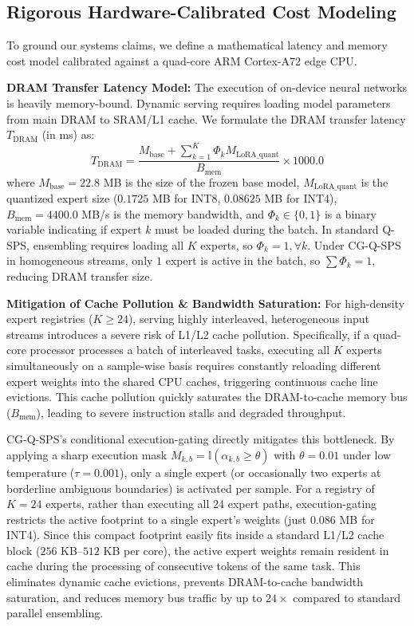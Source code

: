 \subsection{Rigorous Hardware-Calibrated Cost Modeling}
To ground our systems claims, we define a mathematical latency and memory cost model calibrated against a quad-core ARM Cortex-A72 edge CPU.

\textbf{DRAM Transfer Latency Model:} The execution of on-device neural networks is heavily memory-bound. Dynamic serving requires loading model parameters from main DRAM to SRAM/L1 cache. We formulate the DRAM transfer latency $T_{\text{DRAM}}$ (in ms) as:
\begin{equation}
  T_{\text{DRAM}} = \frac{M_{\text{base}} + \sum_{k=1}^K \Phi_k M_{\text{LoRA\_quant}}}{B_{\text{mem}}} \times 1000.0
\end{equation}
where $M_{\text{base}} = 22.8$ MB is the size of the frozen base model, $M_{\text{LoRA\_quant}}$ is the quantized expert size ($0.1725$ MB for INT8, $0.08625$ MB for INT4), $B_{\text{mem}} = 4400.0$ MB/s is the memory bandwidth, and $\Phi_k \in \{0, 1\}$ is a binary variable indicating if expert $k$ must be loaded during the batch.
In standard Q-SPS, ensembling requires loading all $K$ experts, so $\Phi_k = 1, \forall k$. Under CG-Q-SPS in homogeneous streams, only $1$ expert is active in the batch, so $\sum \Phi_k = 1$, reducing DRAM transfer size.

\textbf{Mitigation of Cache Pollution \& Bandwidth Saturation:} For high-density expert registries ($K \ge 24$), serving highly interleaved, heterogeneous input streams introduces a severe risk of L1/L2 cache pollution. Specifically, if a quad-core processor processes a batch of interleaved tasks, executing all $K$ experts simultaneously on a sample-wise basis requires constantly reloading different expert weights into the shared CPU caches, triggering continuous cache line evictions. This cache pollution quickly saturates the DRAM-to-cache memory bus ($B_{\text{mem}}$), leading to severe instruction stalls and degraded throughput. 

CG-Q-SPS's conditional execution-gating directly mitigates this bottleneck. By applying a sharp execution mask $M_{k, b} = \mathbb{I}(\alpha_{k, b} \ge \theta)$ with $\theta=0.01$ under low temperature ($\tau=0.001$), only a single expert (or occasionally two experts at borderline ambiguous boundaries) is activated per sample. For a registry of $K=24$ experts, rather than executing all 24 expert paths, execution-gating restricts the active footprint to a single expert's weights (just $0.086$ MB for INT4). Since this compact footprint easily fits inside a standard L1/L2 cache block ($256$ KB--$512$ KB per core), the active expert weights remain resident in cache during the processing of consecutive tokens of the same task. This eliminates dynamic cache evictions, prevents DRAM-to-cache bandwidth saturation, and reduces memory bus traffic by up to $24\times$ compared to standard parallel ensembling.


